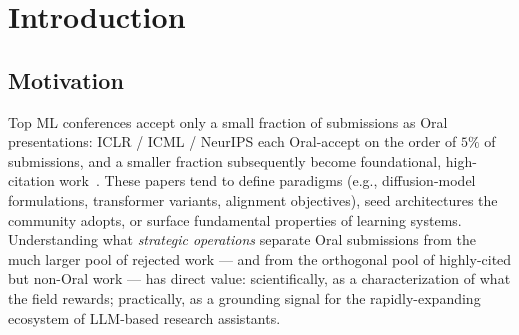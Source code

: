 \documentclass[10pt,a4paper]{article}
\begin{document}
\begin{abstract}
We package these findings as a model-agnostic two-tier skill. The parent skill drives a five-phase workflow: literature retrieval across DBLP / OpenAlex / OpenReview / arXiv (Phase 0), bottleneck identification grounded in $\geq 2$ retrieved papers (Phase 1), innovation-pattern selection by structural fit followed by single-candidate generation with mechanism-specific signature terms (Phase 2), a corpus-anchored audit performing three checks --- composition-scoped reject-pattern scan against the candidate's chosen sub-pattern card and any secondary patterns' methodology cards, anti-pattern substantive-mitigation verification, and paper-pointed threat search across the unified pool of Phase-0 broad retrieval and Phase-3.1 mechanism-specific retrieval (Phase 3) --- with mechanical revision of named candidate fields when audit verdict is \texttt{revise}, and finally expansion into a structured idea card with motivation, method flow, falsification prediction, mechanism probe, and a five-axis feasibility validation (Phase 4). Two mechanical contracts govern the skill: \texttt{kill\_switch\_integrity} enforces that the candidate's three falsification-anchor fields (what we run, compute budget, mechanism probe) remain byte-identical from Phase 2 through Phase 4, and \texttt{expansion\_completeness} verifies the idea card has all required structural sections. The skill produces a single idea card as PDF + Markdown + JSON; it runs unchanged on Claude, GPT, Gemini, or open-weights backends. Dataset, innovation pattern cards, sub-pattern cards, the domain matrix, and both skills are released open source.
\end{abstract}

\tableofcontents
\newpage


\section{Introduction}
\label{sec:intro}

\subsection{Motivation}

Top ML conferences accept only a small fraction of submissions as Oral presentations: ICLR / ICML / NeurIPS each Oral-accept on the order of \(5\%\) of submissions, and a smaller fraction subsequently become foundational, high-citation work~\cite{wang2024scireasoning}. These papers tend to define paradigms (e.g., diffusion-model formulations, transformer variants, alignment objectives), seed architectures the community adopts, or surface fundamental properties of learning systems. Understanding what \emph{strategic operations} separate Oral submissions from the much larger pool of rejected work --- and from the orthogonal pool of highly-cited but non-Oral work --- has direct value: scientifically, as a characterization of what the field rewards; practically, as a grounding signal for the rapidly-expanding ecosystem of LLM-based research assistants.
\end{document}
